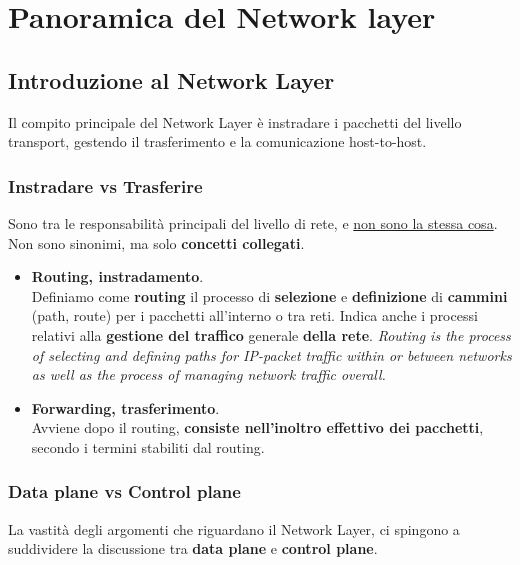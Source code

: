 \chapter{Panoramica del Network layer}

\section{Introduzione al Network Layer}
Il compito principale del Network Layer è instradare i pacchetti del livello transport, gestendo il trasferimento e la comunicazione host-to-host.



\subsection{Instradare vs Trasferire}
Sono tra le responsabilità principali del livello di rete, e \underline{non sono la stessa cosa}. Non sono sinonimi, ma solo \textbf{concetti collegati}.

\begin{itemize}
	\item \textbf{Routing, instradamento}.\\
	Definiamo come \textbf{routing} il processo di \textbf{selezione} e \textbf{definizione} di \textbf{cammini} (path, route) per i pacchetti all'interno o tra reti. Indica anche i processi relativi alla \textbf{gestione del traffico} generale \textbf{della rete}. \textit{Routing is the process of selecting and defining paths for IP-packet traffic within or between networks as well as the process of managing network traffic overall.}
	
	\item \textbf{Forwarding, trasferimento}.\\
	Avviene dopo il routing, \textbf{consiste nell'inoltro effettivo dei pacchetti}, secondo i termini stabiliti dal routing.
\end{itemize}

\subsection{Data plane vs Control plane}
La vastità degli argomenti che riguardano il Network Layer, ci spingono a suddividere la discussione tra \textbf{data plane} e \textbf{control plane}.

